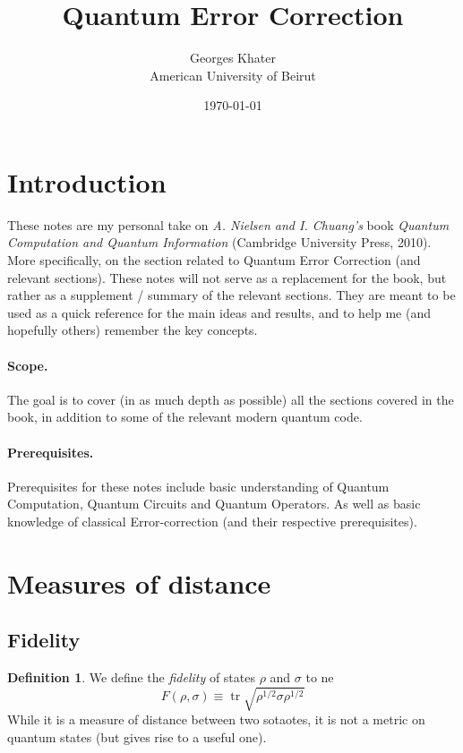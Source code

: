 \documentclass[11pt,a4paper]{article}
\title{\LARGE\bfseries Quantum Error Correction}
\author{Georges Khater \\ \small American University of Beirut}
\date{\today}
\theoremstyle{definition}
\newtheorem{definition}{Definition}[section]
\theoremstyle{plain}
\theoremstyle{remark}
\begin{document}
\maketitle
\tableofcontents
\bigskip

\section{Introduction}
These notes are my personal take on \emph{A. Nielsen and I. Chuang's} book \emph{Quantum Computation and Quantum Information} (Cambridge University Press, 2010). More specifically, 
on the section related to Quantum Error Correction (and relevant sections). 
These notes will not serve as a replacement for the book, but rather as a supplement / summary of the relevant sections. They are meant to be 
used as a quick reference for the main ideas and results, and to help me (and hopefully others) remember the key concepts. 

\paragraph{Scope.}
The goal is to cover (in as much depth as possible) all the sections covered in the book, in addition to some of the relevant modern quantum code. 

\paragraph{Prerequisites.}
Prerequisites for these notes include basic understanding of Quantum Computation, Quantum Circuits and Quantum Operators. As well as basic knowledge of 
classical Error-correction (and their respective prerequisites).  

\section{Measures of distance} 

\subsection{Fidelity}

\begin{definition}\label{def:fidelity}
  We define the \emph{fidelity} of states $\rho$ and $\sigma$ to ne 
  $$F(\rho, \sigma) \equiv \operatorname{tr} \sqrt{\rho^{1/2} \sigma \rho^{1/2}}$$
  While it is a measure of distance between two sotaotes, it is not a metric on quantum states (but gives rise to a useful one). 
\end{definition}
\end{document}
